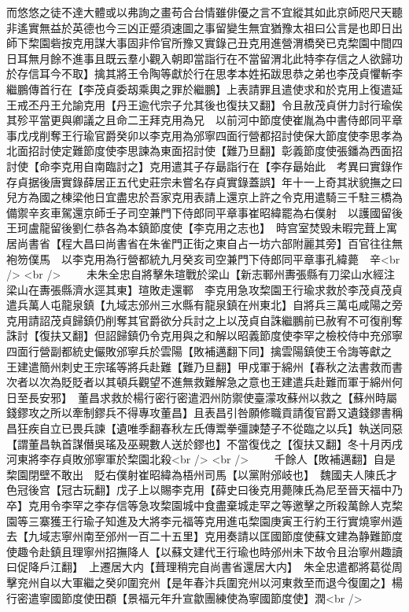 而悠悠之徒不達大體或以弗詢之畫苟合台情雖俳優之言不宜縱其如此京師咫尺天聽非遙實無益於英德也今三凶正蹙須速圖之事留變生無宜猶豫太祖曰公言是也即日出師下棃園砦按克用謀大事固非伶官所豫又實錄己丑克用進營渭橋癸已克棃園中間四日耳無月餘不進事且既云羣小觀入朝即當詣行在不當留渭北此特李存信之人欲歸功於存信耳今不取】擒其將王令陶等獻於行在思孝本姓拓跋思恭之弟也李茂貞懼斬李繼鵬傳首行在【李茂貞委刼乘輿之罪於繼鵬】上表請罪且遣使求和於克用上復遣延王戒丕丹王允諭克用【丹王逾代宗子允其後也復扶又翻】令且赦茂貞併力討行瑜俟其殄平當更與卿議之且命二王拜克用為兄　以前河中節度使崔胤為中書侍郎同平章事戊戌削奪王行瑜官爵癸卯以李克用為邠寧四面行營都招討使保大節度使李思孝為北面招討使定難節度使李思諫為東面招討使【難乃旦翻】彰義節度使張鐇為西面招討使【命李克用自南臨討之】克用遣其子存朂詣行在【李存朂始此　考異曰實錄作存貞据後唐實錄薛居正五代史莊宗未嘗名存貞實錄蓋誤】年十一上奇其狀貌撫之曰兒方為國之棟梁他日宜盡忠於吾家克用表請上還京上許之令克用遣騎三千駐三橋為備禦辛亥車駕還京師壬子司空兼門下侍郎同平章事崔昭緯罷為右僕射　以護國留後王珂盧龍留後劉仁恭各為本鎮節度使【李克用之志也】　時宫室焚毁未暇完葺上寓居尚書省【程大昌曰尚書省在朱雀門正街之東自占一坊六部附麗其旁】百官往往無袍笏僕馬　以李克用為行營都統九月癸亥司空兼門下侍郎同平章事孔緯薨　辛<br />
<br />
　　未朱全忠自將擊朱瑄戰於梁山【新志鄆州夀張縣有刀梁山水經注梁山在夀張縣濟水逕其東】瑄敗走還鄆　李克用急攻棃園王行瑜求救於李茂貞茂貞遣兵萬人屯龍泉鎮【九域志邠州三水縣有龍泉鎮在州東北】自將兵三萬屯咸陽之旁克用請詔茂貞歸鎮仍削奪其官爵欲分兵討之上以茂貞自誅繼鵬前已赦宥不可復削奪誅討【復扶又翻】但詔歸鎮仍令克用與之和解以昭義節度使李罕之檢校侍中充邠寧四面行營副都統史儼敗邠寧兵於雲陽【敗補邁翻下同】擒雲陽鎮使王令誨等獻之　王建遣簡州刺史王宗瑤等將兵赴難【難乃旦翻】甲戍軍于綿州【春秋之法書救而書次者以次為貶貶者以其頓兵觀望不進無救難解急之意也王建遣兵赴難而軍于綿州何日至長安邪】　董昌求救於楊行密行密遣泗州防禦使臺濛攻蘇州以救之【蘇州時屬錢鏐攻之所以牽制鏐兵不得專攻董昌】且表昌引咎願修職貢請復官爵又遺錢鏐書稱昌狂疾自立已畏兵諫【遺唯季翻春秋左氏傳鬻拳彊諫楚子不從臨之以兵】執送同惡【謂董昌執首謀僭吳瑤及巫覡數人送於鏐也】不當復伐之【復扶又翻】冬十月丙戌河東將李存貞敗邠寧軍於棃園北殺<br />
<br />
　　千餘人【敗補邁翻】自是棃園閉壁不敢出　貶右僕射崔昭緯為梧州司馬【以黨附邠岐也】　魏國夫人陳氏才色冠後宫【冠古玩翻】戊子上以賜李克用【薛史曰後克用薨陳氏為尼至晉天福中乃卒】克用令李罕之李存信等急攻棃園城中食盡棄城走罕之等邀擊之所殺萬餘人克棃園等三寨獲王行瑜子知進及大將李元福等克用進屯棃園庚寅王行約王行實燒寧州遁去【九域志寧州南至邠州一百二十五里】克用奏請以匡國節度使蘇文建為静難節度使趣令赴鎮且理寧州招撫降人【以蘇文建代王行瑜也時邠州未下故令且治寧州趣讀曰促降戶江翻】　上遷居大内【葺理稍完自尚書省還居大内】　朱全忠遣都將葛從周擊兖州自以大軍繼之癸卯圍兖州【是年春汴兵圍兖州以河東救至而退今復圍之】楊行密遣寧國節度使田頵【景福元年升宣歙團練使為寧國節度使】潤<br />
